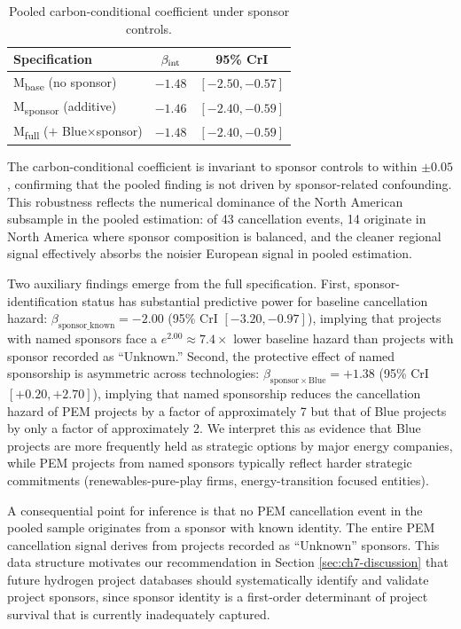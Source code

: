 \begin{table}[h!]
\centering
\caption{Pooled carbon-conditional coefficient under sponsor controls.}
\begin{tabular}{lcc}
\toprule
Specification & $\beta_{\mathrm{int}}$ & 95\% CrI \\
\midrule
M\textsubscript{base} (no sponsor) & $-1.48$ & $[-2.50, -0.57]$ \\
M\textsubscript{sponsor} (additive) & $-1.46$ & $[-2.40, -0.59]$ \\
M\textsubscript{full} ($+$ Blue$\times$sponsor) & $-1.48$ & $[-2.40, -0.59]$ \\
\bottomrule
\end{tabular}
\label{tab:ch7-pooled-sponsor}
\end{table}

The carbon-conditional coefficient is invariant to sponsor controls to within $\pm 0.05$, confirming that the pooled finding is not driven by sponsor-related confounding. This robustness reflects the numerical dominance of the North American subsample in the pooled estimation: of 43 cancellation events, 14 originate in North America where sponsor composition is balanced, and the cleaner regional signal effectively absorbs the noisier European signal in pooled estimation.

Two auxiliary findings emerge from the full specification. First, sponsor-identification status has substantial predictive power for baseline cancellation hazard: $\beta_{\mathrm{sponsor\_known}} = -2.00$ (95\% CrI $[-3.20, -0.97]$), implying that projects with named sponsors face a $e^{2.00} \approx 7.4\times$ lower baseline hazard than projects with sponsor recorded as ``Unknown.'' Second, the protective effect of named sponsorship is asymmetric across technologies: $\beta_{\mathrm{sponsor} \times \mathrm{Blue}} = +1.38$ (95\% CrI $[+0.20, +2.70]$), implying that named sponsorship reduces the cancellation hazard of PEM projects by a factor of approximately 7 but that of Blue projects by only a factor of approximately 2. We interpret this as evidence that Blue projects are more frequently held as strategic options by major energy companies, while PEM projects from named sponsors typically reflect harder strategic commitments (renewables-pure-play firms, energy-transition focused entities).

A consequential point for inference is that no PEM cancellation event in the pooled sample originates from a sponsor with known identity. The entire PEM cancellation signal derives from projects recorded as ``Unknown'' sponsors. This data structure motivates our recommendation in Section \ref{sec:ch7-discussion} that future hydrogen project databases should systematically identify and validate project sponsors, since sponsor identity is a first-order determinant of project survival that is currently inadequately captured.


